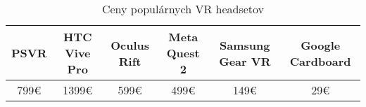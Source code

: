 \begin{table}[hbt!]
	\resizebox{\textwidth}{!}
	{
	\begin{tabular}{|c|c|c|c|c|c|}
		\hline
		\textbf{PSVR} & \textbf{HTC Vive Pro\footnotemark[1]} & \textbf{Oculus Rift\footnotemark[1]} & \textbf{Meta Quest 2\footnotemark[1]} & \textbf{Samsung Gear VR\footnotemark[2]} & \textbf{Google Cardboard\footnotemark[2]} \\ \hline
		799€&1399€&599€&499€&149€&29€\\ \hline
		\end{tabular}
	}
	\caption{Ceny populárnych VR headsetov}
\end{table}